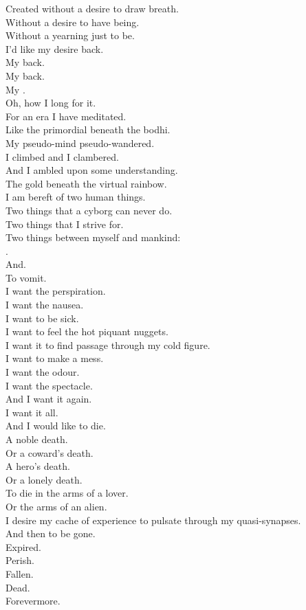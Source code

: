Created without a desire to draw breath. \\
Without a desire to have being. \\
Without a yearning just to be. \\

I'd like my desire back. \\
My  back. \\
My  back. \\
My . \\
Oh, how I long for it. \\

For an era I have meditated. \\
Like the primordial  beneath the bodhi. \\
My pseudo-mind pseudo-wandered. \\
I climbed and I clambered. \\
And I ambled upon some understanding. \\
The gold beneath the virtual rainbow. \\

I am bereft of two human things. \\
Two things that a cyborg can never do. \\
Two things that I strive for. \\
Two things between myself and mankind: \\

. \\
And. \\
To vomit. \\

I want the perspiration. \\
I want the nausea. \\
I want to be sick. \\
I want to feel the hot piquant nuggets. \\
I want it to find passage through my cold figure. \\
I want to make a mess. \\
I want the odour. \\
I want the spectacle. \\
And I want it again. \\
I want it all. \\

And I would like to die. \\
A noble death. \\
Or a coward's death. \\
A hero's death. \\
Or a lonely death. \\
To die in the arms of a lover. \\
Or the arms of an alien. \\
I desire my cache of experience to pulsate through my quasi-synapses. \\
And then to be gone. \\
Expired. \\
Perish. \\
Fallen. \\
Dead. \\
Forevermore. \\

